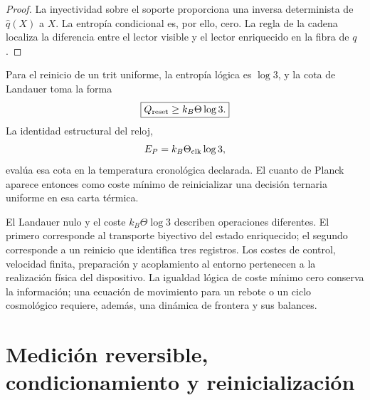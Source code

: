 \begin{proof}
La inyectividad sobre el soporte proporciona una inversa determinista de
\(\widehat q(X)\) a \(X\). La entrop\'ia condicional es, por ello, cero. La
regla de la cadena localiza la diferencia entre el lector visible y el
lector enriquecido en la fibra de \(q\).
\end{proof}

Para el reinicio de un trit uniforme, la entrop\'ia l\'ogica es \(\log3\),
y la cota de Landauer toma la forma
\begin{equation}
 \boxed{Q_{\rm reset}\geq k_B\Theta\log3.}
 \label{eq:rm-obs-trit-reset}
\end{equation}
La identidad estructural del reloj,
\begin{equation}
 E_P=k_B\Theta_{\rm clk}\log3,
 \label{eq:rm-obs-planck-trit-landauer}
\end{equation}
eval\'ua esa cota en la temperatura cronol\'ogica declarada. El cuanto de
Planck aparece entonces como coste m\'inimo de reinicializar una decisi\'on
ternaria uniforme en esa carta t\'ermica.

El Landauer nulo y el coste \(k_B\Theta\log3\) describen operaciones
diferentes. El primero corresponde al transporte biyectivo del estado
enriquecido; el segundo corresponde a un reinicio que identifica tres
registros. Los costes de control, velocidad finita, preparaci\'on y
acoplamiento al entorno pertenecen a la realizaci\'on f\'isica del
dispositivo. La igualdad l\'ogica de coste m\'inimo cero conserva la
informaci\'on; una ecuaci\'on de movimiento para un rebote o un ciclo
cosmol\'ogico requiere, adem\'as, una din\'amica de frontera y sus balances.

\section{Medici\'on reversible, condicionamiento y reinicializaci\'on}

